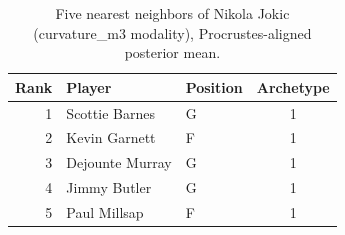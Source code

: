 \begin{table}[htbp]
  \centering\small
  \begin{tabular}{rllc}
    \toprule
    Rank & Player & Position & Archetype \\
    \midrule
    1 & Scottie Barnes & G & 1 \\
    2 & Kevin Garnett & F & 1 \\
    3 & Dejounte Murray & G & 1 \\
    4 & Jimmy Butler & G & 1 \\
    5 & Paul Millsap & F & 1 \\
    \bottomrule
  \end{tabular}
  \caption{Five nearest neighbors of Nikola Jokic (curvature_m3 modality), Procrustes-aligned posterior mean.}
  \label{tab:Nikola_Jokic_neighbors_curvature_m3}
\end{table}

